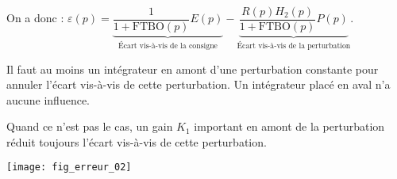 On a donc :
$\varepsilon(p) =\underbrace{\dfrac{1}{1+\text{FTBO}(p)} E(p)}_{\text{\'Ecart vis-à-vis de la consigne}} - \underbrace{\dfrac{R(p)H_2(p)}{1+\text{FTBO}(p)}P(p)}_{\text{\'Ecart vis-à-vis de la perturbation}}$.
%
%
%
%
%

\begin{resultat}
Il faut au moins un intégrateur en amont d'une perturbation constante pour
annuler l'écart vis-à-vis de cette perturbation. Un intégrateur placé en aval n'a aucune
influence.

Quand ce n'est pas le cas, un gain $K_1$ important en amont de la perturbation réduit toujours
l'écart vis-à-vis de cette perturbation.
\end{resultat}


\begin{center}
\texttt{[image: fig\_erreur\_02]}
\end{center}


